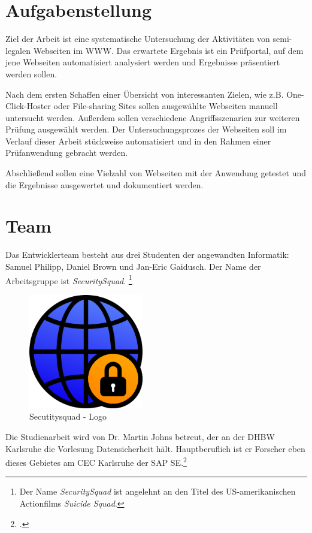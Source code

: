 \section{Aufgabenstellung}
Ziel der Arbeit ist eine systematische Untersuchung der Aktivitäten von semi-legalen Webseiten im \ac{WWW}. Das erwartete Ergebnis ist ein Prüfportal, auf dem jene Webseiten automatisiert analysiert werden und Ergebnisse präsentiert werden sollen.

Nach dem ersten Schaffen einer Übersicht von interessanten Zielen, wie z.B. One-Click-Hoster oder File-sharing Sites sollen ausgewählte Webseiten manuell untersucht werden. Außerdem sollen verschiedene Angriffsszenarien zur weiteren Prüfung ausgewählt werden. Der Untersuchungsprozes der Webseiten soll im Verlauf dieser Arbeit stückweise automatisiert und in den Rahmen einer Prüfanwendung gebracht werden.

Abschließend sollen eine Vielzahl von Webseiten mit der Anwendung getestet und die Ergebnisse ausgewertet und dokumentiert werden.

\section{Team}
Das Entwicklerteam besteht aus drei Studenten der angewandten Informatik:
Samuel Philipp, Daniel Brown und Jan-Eric Gaidusch.
Der Name der Arbeitsgruppe ist \textit{SecuritySquad}.
\footnote{Der Name \textit{SecuritySquad} ist angelehnt an den Titel des US-amerikanischen Actionfilms \textit{Suicide Squad}.}

\begin{figure}[H]
	\centering
	\includegraphics[width=5cm]{images/securitysquad}
	\caption{Secutitysquad - Logo}
	\label{fig:securitysquad-logo}
\end{figure}

Die Studienarbeit wird von Dr. Martin Johns betreut, der an der DHBW Karlsruhe die Vorlesung Datensicherheit hält. Hauptberuflich ist er Forscher eben dieses Gebietes am CEC Karlsruhe der SAP SE.\footcite[Vgl.][]{johnsProfile}


